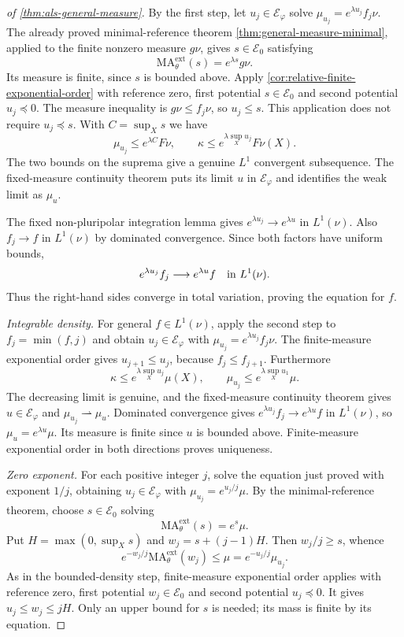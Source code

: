 \begin{proof}[of \cref{thm:als-general-measure}]
By the first step, let $u_j\in\mathcal E_\varphi$ solve $\mu_{u_j}=e^{\lambda u_j}f_j\nu$. The already proved minimal-reference theorem \cref{thm:general-measure-minimal}, applied to the finite nonzero measure $g\nu$, gives $s\in\mathcal E_0$ satisfying
\[
 \mathrm{MA}^{\mathrm{ext}}_\theta(s)=e^{\lambda s}g\nu.
\]
Its measure is finite, since $s$ is bounded above. Apply \cref{cor:relative-finite-exponential-order} with reference zero, first potential $s\in\mathcal E_0$ and second potential $u_j\preceq0$. The measure inequality is $g\nu\leq f_j\nu$, so $u_j\leq s$. This application does not require $u_j\preceq s$. With $C=\sup_Xs$ we have
\[
 \mu_{u_j}\leq e^{\lambda C}F\nu,
 \qquad
 \kappa\leq e^{\lambda\sup_Xu_j}F\nu(X).
\]
The two bounds on the suprema give a genuine $L^1$ convergent subsequence. The fixed-measure continuity theorem puts its limit $u$ in $\mathcal E_\varphi$ and identifies the weak limit as $\mu_u$.

The fixed non-pluripolar integration lemma gives $e^{\lambda u_j}\to e^{\lambda u}$ in $L^1(\nu)$. Also $f_j\to f$ in $L^1(\nu)$ by dominated convergence. Since both factors have uniform bounds,
\[
 e^{\lambda u_j}f_j\longrightarrow e^{\lambda u}f
 \quad\hbox{in }L^1(\nu).
\]
Thus the right-hand sides converge in total variation, proving the equation for $f$.

\emph{Integrable density.} For general $f\in L^1(\nu)$, apply the second step to $f_j=\min(f,j)$ and obtain $u_j\in\mathcal E_\varphi$ with $\mu_{u_j}=e^{\lambda u_j}f_j\nu$. The finite-measure exponential order gives $u_{j+1}\leq u_j$, because $f_j\leq f_{j+1}$. Furthermore
\[
 \kappa\leq e^{\lambda\sup_Xu_j}\mu(X),
 \qquad \mu_{u_j}\leq e^{\lambda\sup_Xu_1}\mu.
\]
The decreasing limit is genuine, and the fixed-measure continuity theorem gives $u\in\mathcal E_\varphi$ and $\mu_{u_j}\rightharpoonup\mu_u$. Dominated convergence gives $e^{\lambda u_j}f_j\to e^{\lambda u}f$ in $L^1(\nu)$, so $\mu_u=e^{\lambda u}\mu$. Its measure is finite since $u$ is bounded above. Finite-measure exponential order in both directions proves uniqueness.

\emph{Zero exponent.} For each positive integer $j$, solve the equation just proved with exponent $1/j$, obtaining $u_j\in\mathcal E_\varphi$ with $\mu_{u_j}=e^{u_j/j}\mu$. By the minimal-reference theorem, choose $s\in\mathcal E_0$ solving
\[
 \mathrm{MA}^{\mathrm{ext}}_\theta(s)=e^s\mu.
\]
Put $H=\max(0,\sup_Xs)$ and $w_j=s+(j-1)H$. Then $w_j/j\geq s$, whence
\[
 e^{-w_j/j}\mathrm{MA}^{\mathrm{ext}}_\theta(w_j)
 \leq\mu
 =e^{-u_j/j}\mu_{u_j}.
\]
As in the bounded-density step, finite-measure exponential order applies with reference zero, first potential $w_j\in\mathcal E_0$ and second potential $u_j\preceq0$. It gives $u_j\leq w_j\leq jH$. Only an upper bound for $s$ is needed; its mass is finite by its equation.


\end{proof}
